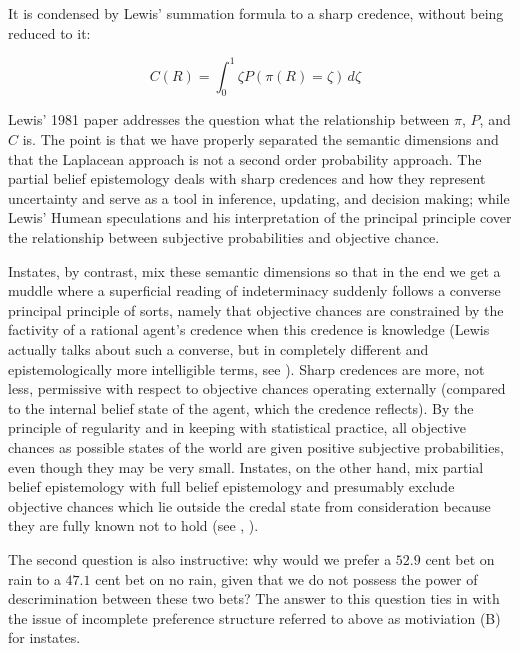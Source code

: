 \documentclass[11pt]{article}
\begin{document}
It is condensed by Lewis' summation formula to a sharp credence,
without being reduced to it:

\begin{equation}
  \label{eq:s2}
  C(R)=\int_{0}^{1}\zeta{}P(\pi(R)=\zeta)\,d\zeta\mbox{ }
\end{equation}

Lewis' 1981 paper 
addresses the question what the relationship between $\pi$, $P$, and
$C$ is. The point is that we have properly separated the semantic
dimensions and that the Laplacean approach is not a second order
probability approach. The partial belief epistemology deals with sharp
credences and how they represent uncertainty and serve as a tool in
inference, updating, and decision making; while Lewis' Humean
speculations and his interpretation of the principal principle cover
the relationship between subjective probabilities and objective
chance.

Instates, by contrast, mix these semantic dimensions so that in the
end we get a muddle where a superficial reading of indeterminacy
suddenly follows a converse principal principle of sorts, namely that
objective chances are constrained by the factivity of a rational
agent's credence when this credence is knowledge (Lewis actually talks
about such a converse, but in completely different and
epistemologically more intelligible terms, see
). Sharp credences are more, not less,
permissive with respect to objective chances operating externally
(compared to the internal belief state of the agent, which the
credence reflects). By the principle of regularity and in keeping with
statistical practice, all objective chances as possible states of the
world are given positive subjective probabilities, even though they
may be very small. Instates, on the other hand, mix partial belief
epistemology with full belief epistemology and presumably exclude
objective chances which lie outside the credal state from
consideration because they are fully known not to hold (see
, ).

The second question is also instructive: why would we prefer a $52.9$
cent bet on rain to a $47.1$ cent bet on no rain, given that we do not
possess the power of descrimination between these two bets? The answer
to this question ties in with the issue of incomplete preference
structure referred to above as motiviation (B) for instates.
\end{document}
